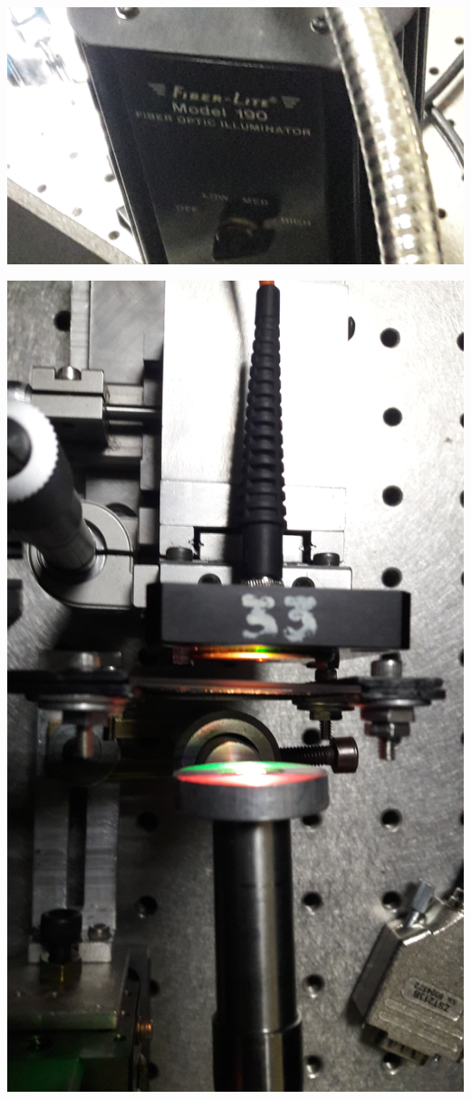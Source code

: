 \documentclass[12pt,dvipsnames]{exam}
\begin{document}
\begin{center}
	\includegraphics[scale=0.1]{imgs/setup_barrido/4.jpg}
\end{center}

\begin{center}
	\includegraphics[scale=0.1]{imgs/setup_barrido/5.jpg}
\end{center}
\end{document}
